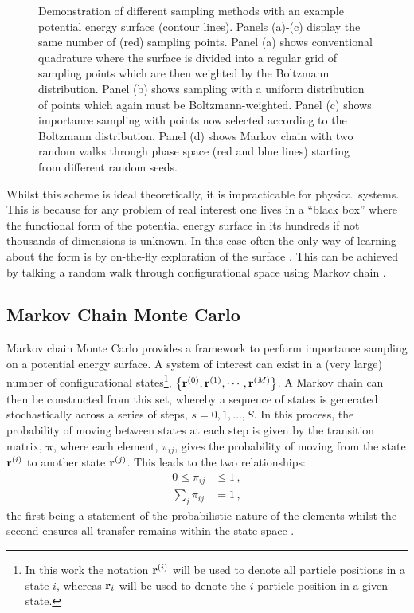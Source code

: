 \begin{figure}[btp]
     \caption{Demonstration of different sampling methods with an example \td{} potential energy surface (contour lines). Panels (a)\--(c) display the same number of (red) sampling points. Panel (a) shows conventional quadrature where the surface is divided into a regular grid of sampling points which are then weighted by the Boltzmann distribution. Panel (b) shows \mc{} sampling with a uniform distribution of points which again must be Boltzmann\--weighted. Panel (c) shows \mc{} importance sampling with points now selected according to the Boltzmann distribution. Panel (d) shows Markov chain \mc{} with two random walks through phase space (red and blue lines) starting from different random seeds.}
     \label{fig:montecarloint}
\end{figure}

Whilst this scheme is ideal theoretically, it is impracticable for physical systems.
This is because for any problem of real interest one lives in a ``black box'' where the functional form of the potential energy surface in its hundreds if not thousands of dimensions is unknown.
In this case often the only way of learning about the form is by on\--the\--fly exploration of the surface \cite{Brooks2011}.
This can be achieved by talking a random walk through configurational space using Markov chain \mc.

\subsection{Markov Chain Monte Carlo}

Markov chain Monte Carlo provides a framework to perform importance sampling on a potential energy surface.
A system of interest can exist in a (very large) number of configurational states\footnote{In this work the notation $\mathbf{r}^{\left(i\right)}$ will be used to denote all particle positions in a state $i$, whereas $\mathbf{r}_{i}$ will be used to denote the $i$\th{} particle position in a given state.}, $\left\{\mathbf{r}^{\left(0\right)},\mathbf{r}^{\left(1\right)},\cdots,\mathbf{r}^{\left(M\right)}\right\}$.
A Markov chain can then be constructed from this set, whereby a sequence of states is generated stochastically across a series of steps, $s=0,1,\dots,S$.
In this process, the probability of moving between states at each step is given by the transition matrix, $\bm{\pi}$, where each element, $\pi_{ij}$, gives the probability of moving from the state $\mathbf{r}^{\left(i\right)}$ to another state $\mathbf{r}^{\left(j\right)}$.  
This leads to the two relationships:
\begin{align}
	0\leq \pi_{ij} &\leq 1\,, \\
	\sum_{j} \pi_{ij} &= 1\,, \label{eq:tmrowsum}
\end{align}
the first being a statement of the probabilistic nature of the elements whilst the second ensures all transfer remains within the state space \cite{Frenkel2002,Allen2017,Brooks2011}.

